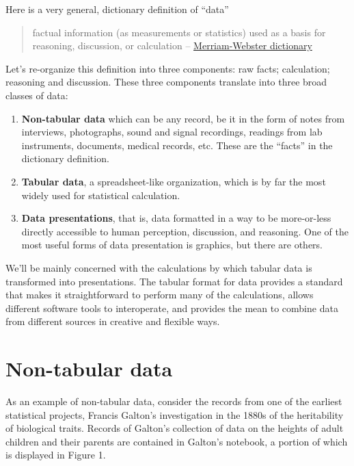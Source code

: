\documentclass[]{book}
\providecommand{\tightlist}{%
  \setlength{\itemsep}{0pt}\setlength{\parskip}{0pt}}
\theoremstyle{definition}
\theoremstyle{definition}
\theoremstyle{definition}
\theoremstyle{remark}
\begin{document}
Here is a very general, dictionary definition of ``data''

\begin{quote}
factual information (as measurements or statistics) used as a basis for
reasoning, discussion, or calculation --
\href{https://www.merriam-webster.com/dictionary/data}{Merriam-Webster
dictionary}
\end{quote}

Let's re-organize this definition into three components: raw facts;
calculation; reasoning and discussion. These three components translate
into three broad classes of data:

\begin{enumerate}
\def\labelenumi{\arabic{enumi}.}
\tightlist
\item
  \textbf{Non-tabular data} which can be any record, be it in the form
  of notes from interviews, photographs, sound and signal recordings,
  readings from lab instruments, documents, medical records, etc. These
  are the ``facts'' in the dictionary definition.
\item
  \textbf{Tabular data}, a spreadsheet-like organization, which is by
  far the most widely used for statistical calculation.
\item
  \textbf{Data presentations}, that is, data formatted in a way to be
  more-or-less directly accessible to human perception, discussion, and
  reasoning. One of the most useful forms of data presentation is
  graphics, but there are others.
\end{enumerate}

We'll be mainly concerned with the calculations by which tabular data is
transformed into presentations. The tabular format for data provides a
standard that makes it straightforward to perform many of the
calculations, allows different software tools to interoperate, and
provides the mean to combine data from different sources in creative and
flexible ways.

\section{Non-tabular data}\label{non-tabular-data}

As an example of non-tabular data, consider the records from one of the
earliest statistical projects, Francis Galton's investigation in the
1880s of the heritability of biological traits. Records of Galton's
collection of data on the heights of adult children and their parents
are contained in Galton's notebook, a portion of which is displayed in
Figure 1.
\end{document}
